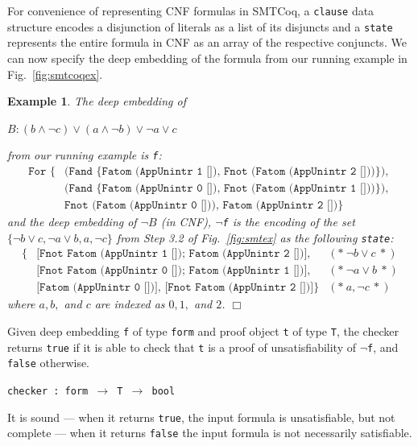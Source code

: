 \documentclass{article}
\newtheorem{example}{Example}[section]
\newcommand{\avar}{Fatom (AppUnintr 0 [])}
\newcommand{\bvar}{Fatom (AppUnintr 1 [])}
\newcommand{\cvar}{Fatom (AppUnintr 2 [])}
\newcommand{\fnot}[1]{Fnot (#1)}
\begin{document}
	For convenience of representing 
	CNF formulas in SMTCoq, a \texttt{clause} 
	data structure encodes a disjunction of 
	literals as a list of its disjuncts
	and a \texttt{state} represents the entire 
	formula in CNF as an array of the 
	respective conjuncts. We can now 
	specify the deep embedding of the 
	formula from our running example in 
	Fig.~\ref{fig:smtcoqex}.
	
	\begin{example}
		\em The deep embedding of 
		\begin{center}
			$B: (b \land \neg c) \lor 
			(a \land \neg b) \lor \neg a 
			\lor c$
		\end{center}
		from our running example is \texttt{f}:
		\begin{align*}
			\texttt{For \{}
				&\texttt{(Fand \{\bvar,\ \fnot{\cvar}\}), }\\
				&\texttt{(Fand \{\avar,\ \fnot{\bvar}\}), }\\
				&\texttt{\fnot \avar, \cvar\}}
		\end{align*}
		and the deep embedding of $\neg B$ 
		(in CNF), \texttt{$\neg$f} is the 
		encoding of the set 
		$\{\neg b \lor c, \neg a \lor b, a, 
		\neg c\}$ from Step 3.2 of 
		Fig.~\ref{fig:smtex} 
		as the following \texttt{state}:
		\begin{align*}
			\{&\texttt{[Fnot Fatom 
			(AppUnintr 1 []); 
			Fatom (AppUnintr 2 [])],} 
			&(*\ \neg b \lor c\ *)\\
			&\texttt{[Fnot Fatom 
			(AppUnintr 0 []); Fatom 
			(AppUnintr 1 [])],} &(*\ 
			\neg a \lor b\ *)\\
			&\texttt{[Fatom (AppUnintr 0 
			[])], [Fnot Fatom (AppUnintr 
			2 [])]}\} &(*\ a, \neg c\ *)  
		\end{align*}
		where $a, b,$ and $c$ are indexed 
		as $0, 1,$ and $2$. \hfill $\Box$
	\end{example}

	Given deep embedding 
	\texttt{f} of type \texttt{form}
	and proof object \texttt{t} of type 
	\texttt{T}, the checker returns 
	\texttt{true} if it is able to 
	check that \texttt{t} is a proof
	of unsatisfiability of \texttt{$\neg$f},
	and \texttt{false} otherwise.
	\begin{center}
		\texttt{checker : form 
			$\to$ T $\to$ bool}	
	\end{center}
	It is sound --- when 
	it returns \texttt{true}, the
	input formula is unsatisfiable, 
	but not complete --- when it 
	returns \texttt{false} the 
	input formula is not necessarily 
	satisfiable. 
	
\end{document}
